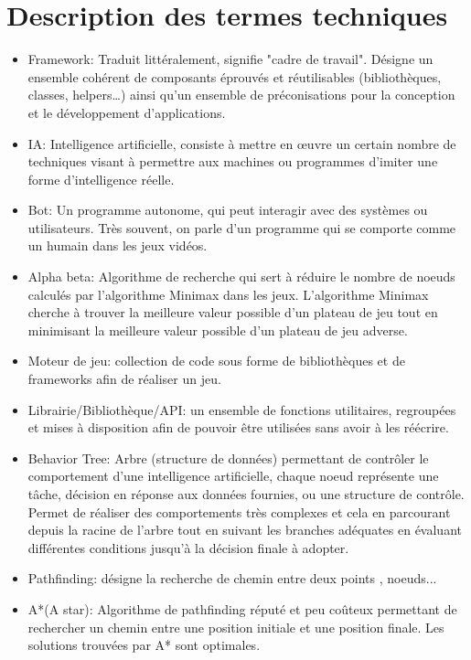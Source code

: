 \section{Description des termes techniques}

\begin{itemize}
    \item Framework: Traduit littéralement, signifie "cadre de travail". Désigne un ensemble cohérent de composants éprouvés et réutilisables (bibliothèques, classes, helpers…) ainsi qu'un ensemble de préconisations pour la conception et le développement d'applications.
    \newline
    \item IA: Intelligence artificielle, consiste à mettre en œuvre un certain nombre de techniques visant à permettre aux machines ou programmes d'imiter une forme d'intelligence réelle.
    \newline
    \item Bot: Un programme autonome, qui peut interagir avec des systèmes ou utilisateurs. Très souvent, on parle d'un programme qui se comporte comme un humain dans les jeux vidéos.
    \newline    
    \item Alpha beta: Algorithme de recherche qui sert à réduire le nombre de noeuds calculés par l'algorithme Minimax dans les jeux. L'algorithme Minimax cherche à trouver la meilleure valeur possible d'un plateau de jeu tout en minimisant la meilleure valeur possible d'un plateau de jeu adverse.\newline


    \item Moteur de jeu: collection de code sous forme de bibliothèques et de frameworks afin de réaliser un jeu.
    \newline
    \item Librairie/Bibliothèque/API: un ensemble de fonctions utilitaires, regroupées et mises à disposition afin de pouvoir être utilisées sans avoir à les réécrire.
    \newline
    \item Behavior Tree: Arbre (structure de données) permettant de contrôler le comportement d'une intelligence artificielle, chaque noeud représente une tâche, décision en réponse aux données fournies, ou une structure de contrôle. Permet de réaliser des comportements très complexes et cela en parcourant depuis la racine de l'arbre tout en suivant les branches adéquates en évaluant différentes conditions jusqu'à la décision finale à adopter.
    \newline
    \item Pathfinding: désigne la recherche de chemin entre deux points , noeuds...
    \newline
    \item A*(A star): Algorithme de pathfinding réputé et peu coûteux permettant de rechercher un chemin entre une position initiale et une position finale. Les solutions trouvées par A* sont optimales.
    \newline
    

\end{itemize}
